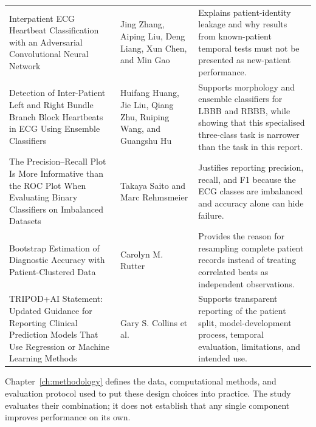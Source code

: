 \begin{longtable}{>{\raggedright\arraybackslash}p{5.0cm}>{\raggedright\arraybackslash}p{3.4cm}>{\raggedright\arraybackslash}p{5.3cm}}
Interpatient ECG Heartbeat Classification with an Adversarial Convolutional Neural Network \cite{zhang2021interpatient} & Jing Zhang, Aiping Liu, Deng Liang, Xun Chen, and Min Gao & Explains patient-identity leakage and why results from known-patient temporal tests must not be presented as new-patient performance.\\
Detection of Inter-Patient Left and Right Bundle Branch Block Heartbeats in ECG Using Ensemble Classifiers \cite{huang2014bbb} & Huifang Huang, Jie Liu, Qiang Zhu, Ruiping Wang, and Guangshu Hu & Supports morphology and ensemble classifiers for LBBB and RBBB, while showing that this specialised three-class task is narrower than the task in this report.\\
The Precision--Recall Plot Is More Informative than the ROC Plot When Evaluating Binary Classifiers on Imbalanced Datasets \cite{saito2015pr} & Takaya Saito and Marc Rehmsmeier & Justifies reporting precision, recall, and F1 because the ECG classes are imbalanced and accuracy alone can hide failure.\\
Bootstrap Estimation of Diagnostic Accuracy with Patient-Clustered Data \cite{rutter2000clustered} & Carolyn M. Rutter & Provides the reason for resampling complete patient records instead of treating correlated beats as independent observations.\\
TRIPOD+AI Statement: Updated Guidance for Reporting Clinical Prediction Models That Use Regression or Machine Learning Methods \cite{collins2024tripodai} & Gary S. Collins et al. & Supports transparent reporting of the patient split, model-development process, temporal evaluation, limitations, and intended use.\\
\bottomrule
\end{longtable}
\endgroup

Chapter~\ref{ch:methodology} defines the data, computational methods, and
evaluation protocol used to put these design choices into practice. The study evaluates their combination;
it does not establish that any single component improves performance on its own.
